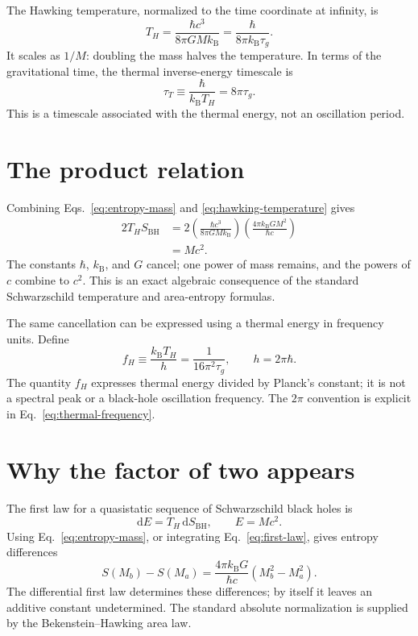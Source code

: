 \documentclass[12pt]{article}
\begin{document}
The Hawking temperature, normalized to the time coordinate at infinity, is \cite{Hawking}
\begin{equation}
  T_H=\frac{\hbar c^3}{8\pi G M k_{\mathrm B}}
  =\frac{\hbar}{8\pi k_{\mathrm B}\tau_g}.
  \label{eq:hawking-temperature}
\end{equation}
It scales as $1/M$: doubling the mass halves the temperature. In terms of the gravitational time, the thermal inverse-energy timescale is
\begin{equation}
  \tau_T\equiv\frac{\hbar}{k_{\mathrm B}T_H}=8\pi\tau_g.
  \label{eq:thermal-timescale}
\end{equation}
This is a timescale associated with the thermal energy, not an oscillation period.

\section{The product relation}

Combining Eqs.~\eqref{eq:entropy-mass} and \eqref{eq:hawking-temperature} gives
\begin{align}
  2T_HS_{\mathrm{BH}}
  &=2\left(\frac{\hbar c^3}{8\pi G M k_{\mathrm B}}\right)
      \left(\frac{4\pi k_{\mathrm B}G M^2}{\hbar c}\right) \\
  &=Mc^2.
  \label{eq:smarr}
\end{align}
The constants $\hbar$, $k_{\mathrm B}$, and $G$ cancel; one power of mass remains, and the powers of $c$ combine to $c^2$. This is an exact algebraic consequence of the standard Schwarzschild temperature and area-entropy formulas.

The same cancellation can be expressed using a thermal energy in frequency units. Define
\begin{equation}
  f_H\equiv\frac{k_{\mathrm B}T_H}{h}
  =\frac{1}{16\pi^2\tau_g},
  \qquad h=2\pi\hbar.
  \label{eq:thermal-frequency}
\end{equation}
The quantity $f_H$ expresses thermal energy divided by Planck's constant; it is not a spectral peak or a black-hole oscillation frequency. The $2\pi$ convention is explicit in Eq.~\eqref{eq:thermal-frequency}.

\section{Why the factor of two appears}

The first law for a quasistatic sequence of Schwarzschild black holes is
\begin{equation}
  \mathrm{d}E=T_H\,\mathrm{d}S_{\mathrm{BH}},
  \qquad E=Mc^2.
  \label{eq:first-law}
\end{equation}
Using Eq.~\eqref{eq:entropy-mass}, or integrating Eq.~\eqref{eq:first-law}, gives entropy differences
\begin{equation}
  S(M_b)-S(M_a)
  =\frac{4\pi k_{\mathrm B}G}{\hbar c}
   \left(M_b^2-M_a^2\right).
  \label{eq:entropy-difference}
\end{equation}
The differential first law determines these differences; by itself it leaves an additive constant undetermined. The standard absolute normalization is supplied by the Bekenstein--Hawking area law.
\end{document}
